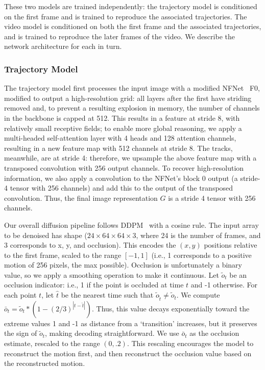 \documentclass[10pt,twocolumn,letterpaper]{article}
\begin{document}
These two models are trained independently: the trajectory model is conditioned on the first frame and is trained to reproduce the associated trajectories.  The video model is conditioned on both the first frame and the associated trajectories, and is trained to reproduce the later frames of the video.  We describe the network architecture for each in turn.

\subsubsection{Trajectory Model}
The trajectory model first processes the input image with a modified NFNet~\cite{brock2021high} F0, modified to output a high-resolution grid: all layers after the first have striding removed and, to prevent a resulting explosion in memory, the number of channels in the backbone is capped at 512.  This results in a feature at stride 8, with relatively small receptive fields; to enable more global reasoning, we apply a multi-headed self-attention layer with 4 heads and 128 attention channels, resulting in a new feature map with 512 channels at stride 8.  The tracks, meanwhile, are at stride 4: therefore, we upsample the above feature map with a transposed convolution with 256 output channels.  To recover high-resolution information, we also apply a convolution to the NFNet's block 0 output (a stride-4 tensor with 256 channels) and add this to the output of the transposed convolution.  Thus, the final image representation $G$ is a stride 4 tensor with 256 channels.

Our overall diffusion pipeline follows DDPM~\cite{ho2020denoising} with a cosine rule.  The input array to be denoised has shape ($24 \times 64\times 64 \times 3$, where 24 is the number of frames, and 3 corresponds to x, y, and occlusion).  This encodes the $(x,y)$ positions relative to the first frame, scaled to the range $[-1,1]$ (i.e., 1 corresponds to a positive motion of 256 pixels, the max possible).  Occlusion is unfortunately a binary value, so we apply a smoothing operation to make it continuous.  Let $\tilde{o}_t$ be an occlusion indicator: i.e., 1 if the point is occluded at time $t$ and -1 otherwise.  For each point $t$, let $\hat{t}$ be the nearest time such that $\tilde{o}_{\hat{t}}\neq \tilde{o}_t$.  We compute $\bar{o}_t=\tilde{o}_t*(1-(2/3)^{|t-\hat{t}|})$.  Thus, this value decays exponentially toward the extreme values 1 and -1 as distance from a `transition' increases, but it preserves the sign of $\tilde{o}_t$, making decoding straightforward.  We use $\bar{o}_t$ as the occlusion estimate, rescaled to the range $(0,.2)$.  This rescaling encourages the model to reconstruct the motion first, and then reconstruct the occlusion value based on the reconstructed motion.
\end{document}
